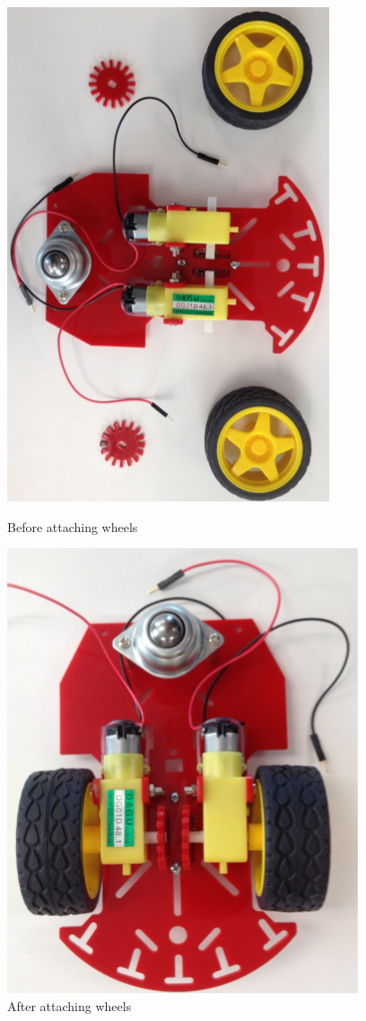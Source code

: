\begin{figure}[h]
\centering
\includegraphics[width=0.4\columnwidth]{Images/Assembly/4a}
\caption{ Before attaching wheels}
\vspace{2mm}
\includegraphics[width=0.4\columnwidth]{Images/Assembly/4b}
\caption{ After attaching wheels}
\label{fig:wheels}
\end{figure}

